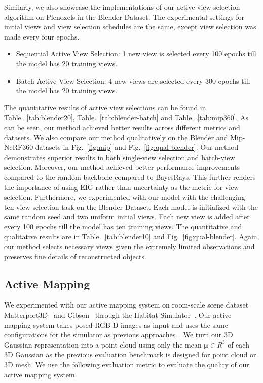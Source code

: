 Similarly, we also showcase the implementations of our active view selection algorithm on Plenoxels in the Blender Dataset. The experimental settings for initial views and view selection schedules are the same, except view selection was made every four epochs.
\noindent
\begin{itemize}
    \item Sequential Active View Selection: 1 new view is selected every 100 epochs till the model has 20 training views. 
    \item Batch Active View Selection: 4 new views are selected every 300 epochs till the model has 20 training views.
\end{itemize}


\noindent
The quantitative results of active view selections can be found in Table.~\ref{tab:blender20}, Table.~\ref{tab:blender-batch} and Table.~\ref{tab:mip360}. As can be seen, our method achieved better results across different metrics and datasets. We also compare our method qualitatively on the Blender and Mip-NeRF360 datasets in Fig.~\ref{fig:mip} and Fig.~\ref{fig:qual-blender}.
Our method demonstrates superior results in both single-view selection and batch-view selection.
Moreover, our method achieved better performance improvements compared to the random backbone compared to BayesRays. This further renders the importance of using EIG rather than uncertainty as the metric for view selection.
Furthermore, we experimented with our model with the challenging ten-view selection task on the Blender Dataset. Each model is initialized with the same random seed and two uniform initial views. Each new view is added after every 100 epochs till the model has ten training views. The quantitative and qualitative results are in Table.~\ref{tab:blender10} and Fig.~\ref{fig:qual-blender}. Again, our method selects necessary views given the extremely limited observations and preserves fine details of reconstructed objects. 
\subsection{Active Mapping}\label{sec:mapping-exp}
\label{sec:active-map}
We experimented with our active mapping system on room-scale scene dataset Matterport3D~\cite{Matterport3D} and Gibson~\cite{xia2018gibson} through the Habitat Simulator~\cite{habitat19iccv, ramakrishnan2021hm3d}.
Our active mapping system takes posed RGB-D images as input and uses the same configurations for the simulator as previous approaches~\cite{yan2023active-neural-mapping, upen}.
We turn our 3D Gaussian representation into a point cloud using only the mean $\mathbf{\mu} \in R^3$ of each 3D Gaussian as the previous evaluation benchmark is designed for point cloud or 3D mesh. 
We use the following evaluation metric to evaluate the quality of our active mapping system.

